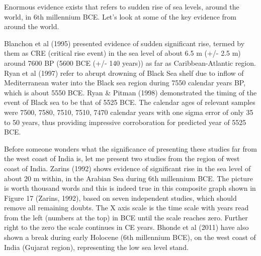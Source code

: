 Enormous evidence exists that refers to sudden rise of sea levels, around the world, in 6th millennium BCE. Let’s look at some of the key evidence from around the world.

Blanchon et al (1995) presented evidence of sudden significant rise, termed by them as CRE (critical rise event) in the sea level of about 6.5 m (+/- 2.5 m) around 7600 BP (5600 BCE (+/- 140 years)) as far as Caribbean-Atlantic region. Ryan et al (1997) refer to abrupt drowning of Black Sea shelf due to inflow of Mediterranean water into the Black sea region during 7550 calendar years BP, which is about 5550 BCE. Ryan \& Pitman (1998) demonstrated the timing of the event of Black sea to be that of 5525 BCE. The calendar ages of relevant samples were 7500, 7580, 7510, 7510, 7470 calendar years with one sigma error of only 35 to 50 years, thus providing impressive corroboration for predicted year of 5525 BCE.

Before someone wonders what the significance of presenting these studies far from the west coast of India is, let me present two studies from the region of west coast of India. Zarins (1992) shows evidence of significant rise in the sea level of about 20 m within, in the Arabian Sea during 6th millennium BCE. The picture is worth thousand words and this is indeed true in this composite graph shown in Figure 17 (Zarins, 1992), based on seven independent studies, which should remove all remaining doubts. The X axis scale is the time scale with years read from the left (numbers at the top) in BCE until the scale reaches zero. Further right to the zero the scale continues in CE years. Bhonde et al (2011) have also shown a break during early Holocene (6th millennium BCE), on the west coast of India (Gujarat region), representing the low sea level stand.

